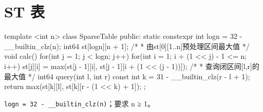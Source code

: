 \section{ST 表}
\begin{codeline}
template <int n>
class SparseTable {
public:
    static constexpr int logn = 32 - __builtin_clz(n);
    int64 st[logn][n + 1]{};
    /*
     * 由st[0][1..n]预处理区间最大值
     */
    void calc() {
        for(int j = 1; j < logn; j++) {
            for(int i = 1; i + (1 << j) - 1 <= n; i++) {
                st[j][i] = max(st[j - 1][i], st[j - 1][i + (1 << (j - 1))]);
            }
        }
    }
    /*
     * 查询闭区间[l,r]的最大值
     */
    int64 query(int l, int r) const {
        int k = 31 - __builtin_clz(r - l + 1);
        return max(st[k][l], st[k][r - (1 << k) + 1]);
    }
};
\end{codeline}
\begin{warnbox}
\texttt{logn = 32 - \_\_builtin\_clz(n)}；要求 n ≥ 1。
\end{warnbox}

